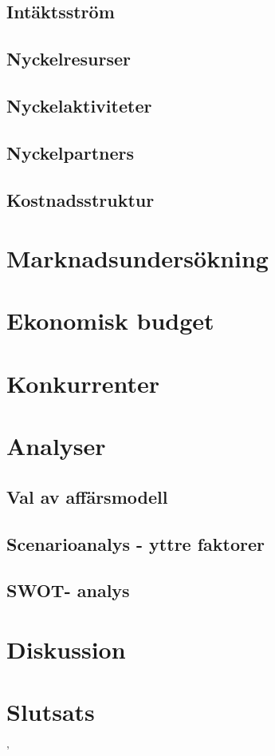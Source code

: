 \documentclass[10pt,a4paper,oneside]{article}
\begin{document}
\subsection{Intäktsström}
\subsection{Nyckelresurser}
\subsection{Nyckelaktiviteter}
\subsection{Nyckelpartners}
\subsection{Kostnadsstruktur}
\newpage

\section{Marknadsundersökning}
\newpage

\section{Ekonomisk budget}
\newpage

\section{Konkurrenter}
\newpage

\section{Analyser}
\subsection{Val av affärsmodell}
\subsection{Scenarioanalys  - yttre faktorer}
\subsection{SWOT- analys}
\newpage

\section{Diskussion}
\newpage

\section{Slutsats}
\newpage


'
\end{document}
